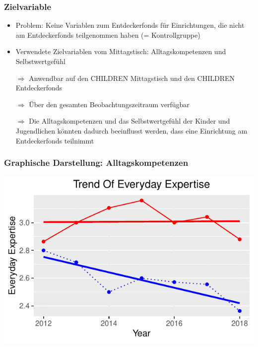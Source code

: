 \begin{frame}[fragile]
\frametitle{Zielvariable}
\begin{itemize}
\item Problem: Keine Variablen zum Entdeckerfonds für Einrichtungen, die nicht am Entdeckerfonds teilgenommen haben (= Kontrollgruppe) 
\item Verwendete Zielvariablen vom Mittagstisch: Alltagskompetenzen und Selbstwertgefühl
\item [$\Rightarrow$] Anwendbar auf den CHILDREN Mittagstisch und den CHILDREN Entdeckerfonds 
\item [$\Rightarrow$] Über den gesamten Beobachtungszeitraum verfügbar
\item [$\Rightarrow$] Die Alltagskompetenzen und das Selbstwertgefühl der Kinder und Jugendlichen könnten dadurch beeinflusst werden, dass eine Einrichtung am Entdeckerfonds teilnimmt
\end{itemize}
\end{frame}

\begin{frame}[fragile]
\frametitle{Graphische Darstellung: Alltagskompetenzen}
\begin{knitrout}\footnotesize
{}\color{fgcolor}

{\centering \includegraphics[width=\maxwidth]{figure/beamer-DIDDtdsplot-1} 

}



\end{knitrout}
\end{frame}

